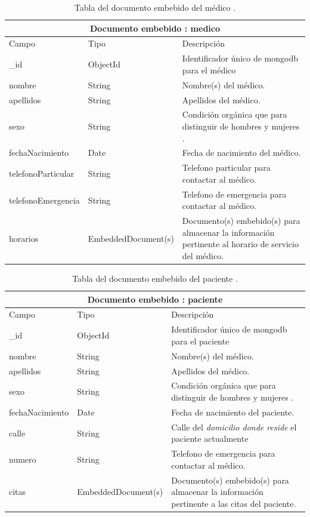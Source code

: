 	\begin{table}[htb]
	\centering
	\begin{tabular}{| p{3.5cm}| p{3.0cm} | p{9.8cm} |}
	\hline
	\multicolumn{3}{|c|}{Documento embebido : medico} \\
	\hline
	Campo & Tipo &  Descripción\\ \hline
	\_id & ObjectId & Identificador único de mongodb para el médico \\ \hline
	nombre & String & Nombre(s) del médico.\\ \hline
	apellidos & String & Apellidos del médico.\\ \hline
	sexo & String & Condición orgánica que para distinguir de hombres y mujeres .\\ \hline
	fechaNacimiento & Date &  Fecha de nacimiento del médico.\\ \hline
	telefonoParticular & String & Telefono particular para contactar al médico.\\ \hline
	telefonoEmergencia & String & Telefono de emergencia para contactar al médico.\\ \hline
	horarios & EmbeddedDocument(s) &  Documento(s) embebido(s) para almacenar la información pertinente al horario de servicio del médico.\\ \hline

	\end{tabular}
	\caption{Tabla del documento embebido del médico .}
	\label{tabla:diccionarioDatos}
	\end{table}
	\begin{table}[htb]
	\centering
	\begin{tabular}{| p{3.5cm}| p{3.0cm} | p{9.8cm} |}
	\hline
	\multicolumn{3}{|c|}{Documento embebido : paciente} \\
	\hline
	Campo & Tipo &  Descripción\\ \hline
	\_id & ObjectId & Identificador único de mongodb para el paciente \\ \hline
	nombre & String & Nombre(s) del médico.\\ \hline
	apellidos & String & Apellidos del médico.\\ \hline
	sexo & String & Condición orgánica que para distinguir de hombres y mujeres .\\ \hline
	fechaNacimiento & Date &  Fecha de nacimiento del paciente.\\ \hline
	calle & String & Calle del \textit{domicilio donde reside }el paciente actualmente\\ \hline
	numero & String & Telefono de emergencia para contactar al médico.\\ \hline
	citas & EmbeddedDocument(s) &  Documento(s) embebido(s) para almacenar la información pertinente a las citas del paciente.\\ \hline

	\end{tabular}
	\caption{Tabla del documento embebido del paciente .}
	\label{tabla:diccionarioDatos}
	\end{table}
	

